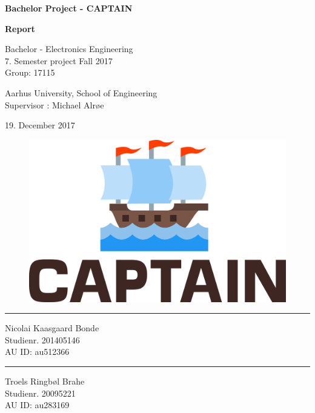 \begin{titlingpage}
		
	\begin{center}
			{\huge\bfseries Bachelor Project - CAPTAIN}\\
			\vspace{10pt}
			
			{\Huge\bfseries Report}\\
			
			\vspace{20pt}
			
			{Bachelor - Electronics Engineering}\\
			{\large 7. Semester project Fall 2017}\\
			{Group: 17115}
			
			\vspace{10pt}
			
			Aarhus University, School of Engineering\\
			Supervisor : Michael Alrøe
			\vspace{10pt}
			
			19. December 2017
			\vspace{10pt}
			\begin{figure}[H]
				\centering
				\includegraphics[max width=0.7\linewidth]{forside.png}
			\end{figure}
			\vspace{100pt}
			\begin{minipage}{0.40\linewidth}
				\centering
				\hrule
				\vspace{12pt}
				Nicolai Kaasgaard Bonde\\
				Studienr. 201405146\\
				AU ID: au512366
			\end{minipage}
			\hspace{50pt}
			\begin{minipage}{0.40\linewidth}
				\centering
				\hrule
				\vspace{12pt}
				Troels Ringbøl Brahe\\
				Studienr. 20095221\\
				AU ID: au283169
			\end{minipage}
	\end{center}
\end{titlingpage}
